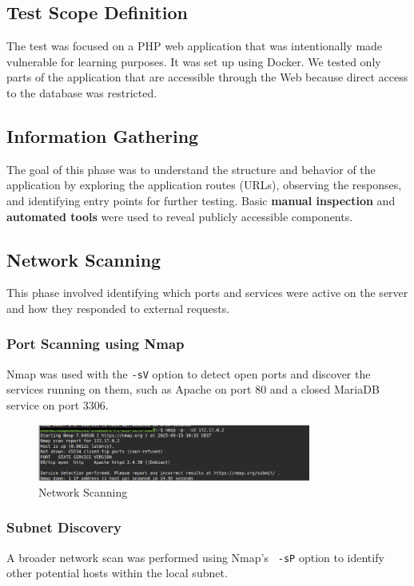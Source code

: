 \documentclass[12pt]{article}
\begin{document}
\subsection{Test Scope Definition}
The test was focused on a PHP web application that was intentionally made vulnerable for learning purposes. It was set up using Docker. We tested only parts of the application that are accessible through the Web because direct access to the database was restricted.


\subsection{Information Gathering}
The goal of this phase was to understand the structure and behavior of the application by exploring the application routes (URLs), observing the responses, and identifying entry points for further testing.
Basic \textbf{manual inspection} and \textbf{automated tools} were used to reveal publicly accessible components.

\subsection{Network Scanning}
This phase involved identifying which ports and services were active on the server and how they responded to external requests.

\subsubsection{Port Scanning using Nmap}
Nmap was used with the \texttt{-sV} option to detect open ports and discover the services running on them, such as Apache on port 80 and a closed MariaDB service on port 3306.
    \begin{figure}[h!]
    \centering
    \includegraphics[width=0.8\textwidth]{NetworkScan.png}
    \caption{Network Scanning}
    \label{fig:sql_injection}
    \end{figure}
    \FloatBarrier

\subsubsection{Subnet Discovery}
A broader network scan was performed using Nmap's \texttt{ -sP} option to identify other potential hosts within the local subnet.
\end{document}
